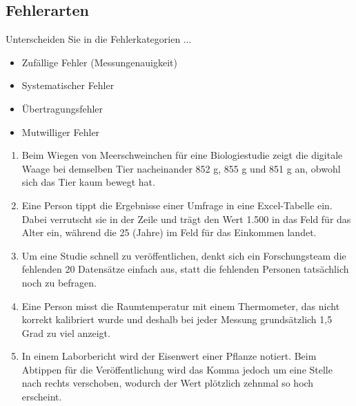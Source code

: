 \newpage

\subsection{Fehlerarten}

Unterscheiden Sie in die Fehlerkategorien ...


\begin{itemize}
\item Zufällige Fehler (Messungenauigkeit)
\item Systematischer Fehler
\item Übertragungsfehler
\item Mutwilliger Fehler
\end{itemize}

\begin{enumerate}
\item 
 Beim Wiegen von Meerschweinchen für eine Biologiestudie zeigt die digitale Waage bei demselben Tier nacheinander 852 g, 855 g
     und 851 g an, obwohl sich das Tier kaum bewegt hat. 

\item
Eine Person tippt die Ergebnisse einer Umfrage in eine Excel-Tabelle ein. Dabei verrutscht sie in der Zeile und trägt den Wert 1.500
     in das Feld für das Alter ein, während die 25 (Jahre) im Feld für das Einkommen landet. 

\item
Um eine Studie schnell zu veröffentlichen, denkt sich ein Forschungsteam die fehlenden 20 Datensätze einfach aus, statt die fehlenden
     Personen tatsächlich noch zu befragen. 

\item
Eine Person misst die Raumtemperatur mit einem Thermometer, das nicht korrekt kalibriert wurde und deshalb bei jeder Messung
     grundsätzlich 1,5 Grad zu viel anzeigt. 

\item
In einem Laborbericht wird der Eisenwert einer Pflanze notiert. Beim Abtippen für die Veröffentlichung wird das Komma jedoch um
     eine Stelle nach rechts verschoben, wodurch der Wert plötzlich zehnmal so hoch erscheint. 


\end{enumerate}
